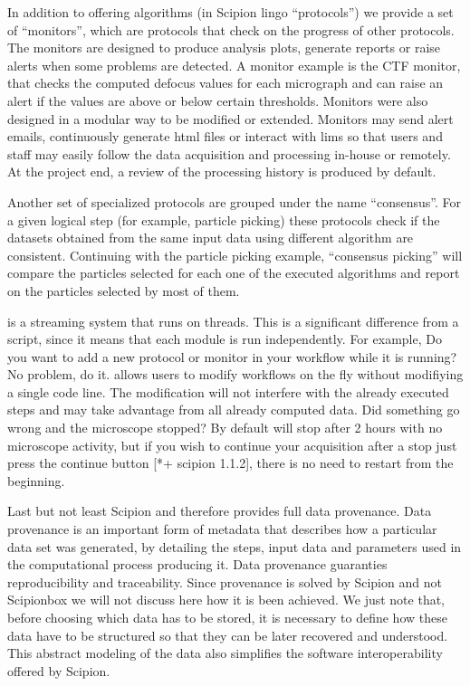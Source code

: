 In addition to offering algorithms (in Scipion lingo ``protocols'') we provide 
a set of ``monitors'', which are protocols that  check on the progress of other protocols. The monitors are designed to produce analysis plots, generate reports or raise alerts when some problems are detected. A monitor example is the CTF monitor, that checks the computed defocus values for
each micrograph and can raise an alert if the values are above or below certain thresholds.
Monitors were also designed in a modular way to be modified or extended. 
Monitors may send alert emails, continuously generate html files or interact with lims so that users and staff may easily follow the data acquisition and processing in-house or remotely. At the project end, a review of the processing history is produced by default.

Another set of  specialized protocols are grouped under the name ``consensus''. For a given logical step (for example, particle picking) these protocols check if the datasets obtained from the same input data using different algorithm are consistent. Continuing with the particle picking example, ``consensus picking'' will compare the particles selected for each one of the executed algorithms and report on the particles selected by most of them.

\scipionbox is a streaming system that runs on threads. This is a significant difference from a script, since it means that each module is run independently. For example, Do you want to add a new protocol or monitor in your workflow while it is running? No problem, do it. \scipionbox allows users to modify  workflows on the fly without modifiying a single code line. The modification will not interfere with the already executed steps and may take advantage from all already computed data. Did something go wrong and the microscope stopped? By default \scipionbox will stop after 2 hours with no microscope activity, but if you wish to continue your acquisition after a stop just press the continue button [*+ scipion 1.1.2], there is no need to restart from the beginning.

Last but not least Scipion and therefore \scipionbox provides full data provenance. Data provenance is an important form of metadata that describes how a particular data set was generated, by detailing the steps, input data and parameters used in the computational process producing it. Data provenance guaranties reproducibility and traceability. Since provenance is solved by Scipion and not Scipionbox we will not discuss here how it is been achieved. We just note that, before choosing which data has to be stored, it is necessary to define how these data have to be structured so that they can be later recovered and understood. This abstract modeling of the data also simplifies the software interoperability offered by Scipion.




 

